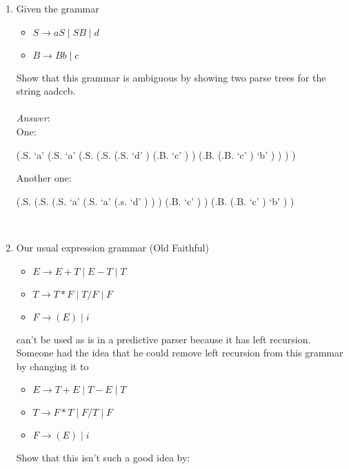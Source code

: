 \documentclass[fleqn]{article}
\begin{document}
\begin{enumerate}
  \hfill\newline
  \item Given the grammar
  \begin{itemize}
    \item $S \rightarrow aS\; |\; SB\; |\; d$
    \item $B \rightarrow Bb\; |\; c$
  \end{itemize}
  Show that this grammar is ambiguous by showing two parse trees for the string aadccb.\\\\
  \textit{Answer}:\\
  One:
  \begin{parsetree}
    (.S.
      `a'
      (.S.
        `a'
        (.S.
          (.S.
            (.S.
              `d'
            )
            (.B.
              `c'
            )
          )
          (.B.
            (.B.
              `c'
            )
            `b'
          )
        )
      )
    )
  \end{parsetree}
  Another one:
  \begin{parsetree}
    (.S.
      (.S.
        (.S.
          `a'
          (.S.
            `a'
            (.s.
              `d'
            )
          )
        )
        (.B.
          `c'
        )
      )
      (.B.
        (.B.
          `c'
        )
        `b'
      )
    )
  \end{parsetree}\\

  \newpage
  \item Our usual expression grammar (Old Faithful)
  \begin{itemize}
    \item $E \rightarrow E + T \; | \; E - T \; | \; T$
    \item $T \rightarrow T * F \; | \; T / F \; | \; F$
    \item $F \rightarrow (E) \; | \; i$
  \end{itemize}
  can't be used as is in a predictive parser because it has left recursion. Someone had the idea that he could remove left recursion from this grammar by changing it to
  \begin{itemize}
    \item $E \rightarrow T + E \; | \; T - E \; | \; T$
    \item $T \rightarrow F * T \; | \; F / T \; | \; F$
    \item $F \rightarrow (E) \; | \; i$
  \end{itemize}
  Show that this isn’t such a good idea by:


\end{enumerate}
\end{document}
